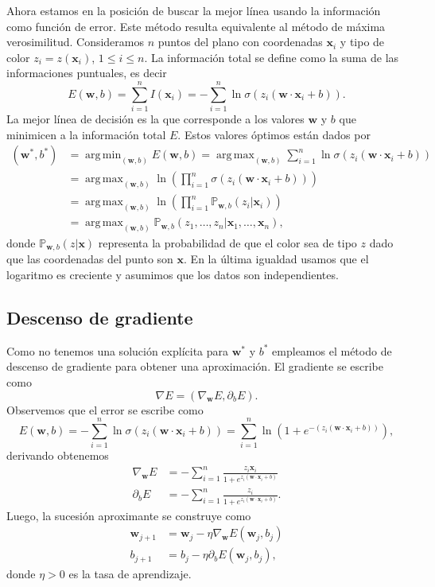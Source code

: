 \documentclass[12pt, a4paper]{amsbook}
\def\argmin{\operatorname {\mathrm{arg\, min}}}
\def\argmax{\operatorname {\mathrm{arg\, max}}}
\renewcommand{\P}{{\mathbb P}}
\newcommand{\ww}{{\mathbf w}}
\newcommand{\xx}{{\mathbf x}}
\theoremstyle{remark}
\theoremstyle{definition}
\numberwithin{section}{chapter}
\numberwithin{subsection}{section}
\numberwithin{equation}{section}
\numberwithin{figure}{chapter}
\begin{document}
Ahora estamos en la posición de buscar la mejor línea usando la información como función de error. Este método resulta equivalente al método de máxima verosimilitud. Consideramos $n$ puntos del plano con coordenadas $\xx_i$ y tipo de color $z_i = z(\xx_i)$, $1\le i\le n$. La información total se define como la suma de las informaciones puntuales, es decir
$$
E(\ww, b) = \sum_{i=1}^n I(\xx_i) = -\sum_{i=1}^n \ln \sigma(z_i (\ww\cdot\xx_i + b)). 
$$
La mejor línea de decisión es la que corresponde a los valores $\ww$ y $b$ que minimicen a la información total $E$. Estos valores óptimos están dados por
\begin{align*}
(\ww^*, b^*) &= \argmin_{(\ww, b)} E(\ww, b) = \argmax_{(\ww,b)} \sum_{i=1}^n \ln \sigma(z_i (\ww\cdot\xx_i + b))\\
&= \argmax_{(\ww, b)} \ln\left(\prod_{i=1}^n \sigma(z_i (\ww\cdot\xx_i + b))\right)\\
&= \argmax_{(\ww, b)} \ln\left(\prod_{i=1}^n \P_{\ww, b} (z_i|\xx_i)\right)\\
&= \argmax_{(\ww, b)} \P_{\ww, b} (z_1,\dots,z_n |\xx_1,\dots,\xx_n),
\end{align*}
donde $\P_{\ww, b}(z|\xx)$ representa la probabilidad de que el color sea de tipo $z$ dado que las coordenadas del punto son $\xx$. En la última igualdad usamos que el logaritmo es creciente y asumimos que los datos son independientes. 

\subsection*{Descenso de gradiente} Como no tenemos una solución explícita para $\ww^*$ y $b^*$ empleamos el método de descenso de gradiente para obtener una aproximación. El gradiente se escribe como
$$
\nabla E = (\nabla_\ww E, \partial_b E).
$$
Observemos que el error se escribe como
$$
E(\ww, b) = -\sum_{i=1}^n \ln \sigma(z_i (\ww\cdot\xx_i + b)) = \sum_{i=1}^n \ln(1+e^{-(z_i(\ww\cdot\xx_i+ b))}), 
$$
derivando obtenemos
\begin{align*}
\nabla_\ww E &= -\sum_{i=1}^n \frac{z_i\xx_i}{1+e^{z_i(\ww\cdot\xx_i+ b)}}\\
\partial_b E &= -\sum_{i=1}^n \frac{z_i}{1+e^{z_i(\ww\cdot\xx_i+ b)}}.
\end{align*}
Luego, la sucesión aproximante se construye como
\begin{align*}
\ww_{j+1} &= \ww_j - \eta \nabla_\ww E(\ww_j, b_j)\\
b_{j+1} &= b_j - \eta \partial_b E(\ww_j, b_j),
\end{align*}
donde $\eta>0$ es la tasa de aprendizaje.
\end{document}
